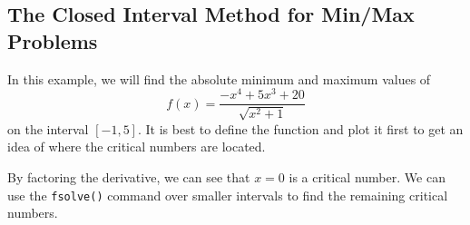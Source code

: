 \subsection{The Closed Interval Method for Min/Max Problems}
\label{subsec:closed_interval_method}



In this example, we will find the absolute minimum and maximum values of 
\begin{equation*}
\displaystyle f(x) = \frac {-x^4+5x^3+20}{\sqrt{x^2+1}}
\end{equation*}
on the interval $[-1,5]$. It is best to define the function and plot it first to get an idea of where the critical numbers are located.

\begin{maplegroup}
\begin{mapleinput}
\end{mapleinput}
\mapleresult
\begin{maplelatex}
\end{maplelatex}
\end{maplegroup}


\begin{maplegroup}
\begin{mapleinput}
\label{Plot!plot}
\end{mapleinput}
\mapleresult
{}
\end{maplegroup}

By factoring the derivative, we can see that $x=0$ is a critical number. We can use the \texttt{fsolve()} command over smaller intervals to find the remaining critical numbers.


